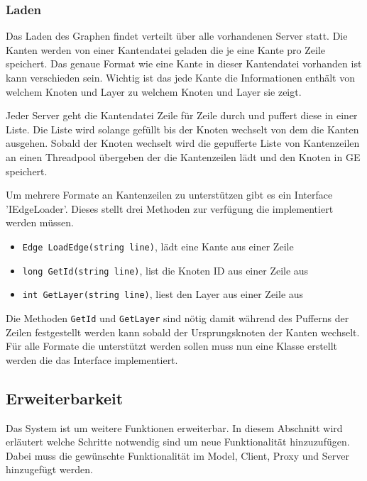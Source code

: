 \subsubsection{Laden}

Das Laden des Graphen findet verteilt über alle vorhandenen Server statt. Die Kanten werden von einer Kantendatei geladen die je eine Kante pro Zeile speichert. Das genaue Format wie eine Kante in dieser Kantendatei vorhanden ist kann verschieden sein. Wichtig ist das jede Kante die Informationen enthält von welchem Knoten und Layer zu welchem Knoten und Layer sie zeigt.

Jeder Server geht die Kantendatei Zeile für Zeile durch und puffert diese in einer Liste. Die Liste wird solange gefüllt bis der Knoten wechselt von dem die Kanten ausgehen. Sobald der Knoten wechselt wird die gepufferte Liste von Kantenzeilen an einen Threadpool übergeben der die Kantenzeilen lädt und den Knoten in GE speichert.

Um mehrere Formate an Kantenzeilen zu unterstützen gibt es ein Interface 'IEdgeLoader'. Dieses stellt drei Methoden zur verfügung die implementiert werden müssen.

\begin{itemize}
  \item \verb|Edge LoadEdge(string line)|, lädt eine Kante aus einer Zeile
  \item \verb|long GetId(string line)|, list die Knoten ID aus einer Zeile aus
  \item \verb|int GetLayer(string line)|, liest den Layer aus einer Zeile aus
\end{itemize}

Die Methoden \verb|GetId| und \verb|GetLayer| sind nötig damit während des Pufferns der Zeilen festgestellt werden kann sobald der Ursprungsknoten der Kanten wechselt.
Für alle Formate die unterstützt werden sollen muss nun eine Klasse erstellt werden die das Interface implementiert.



\subsection{Erweiterbarkeit}

Das System ist um weitere Funktionen erweiterbar. In diesem Abschnitt wird erläutert welche Schritte notwendig sind um neue Funktionalität hinzuzufügen.
Dabei muss die gewünschte Funktionalität im Model, Client, Proxy und Server hinzugefügt werden.


